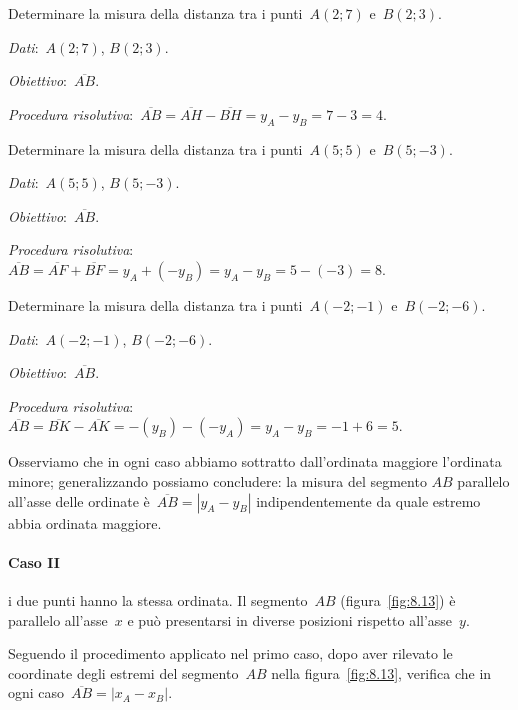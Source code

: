 \begin{exrig}
 \begin{esempio}
Determinare la misura della distanza tra i punti~$A(2;7)$ e~$B(2;3)$.

\emph{Dati}:~$A(2;7)$, $B(2;3)$.

\emph{Obiettivo}:~$\overline{AB}$.

\emph{Procedura risolutiva}:~$\overline{AB}=\overline{AH}-\overline{BH}=y_{A}-y_{B}=7-3=4$.

 \end{esempio}
 \begin{esempio}
 \label{ex:8.16}
Determinare la misura della distanza tra i punti~$A(5;5)$ e~$B(5;-3)$.

\emph{Dati}:~$A(5;5)$, $B(5;-3)$.

\emph{Obiettivo}:~$\overline{AB}$.

\emph{Procedura risolutiva}:~$\overline{AB}=\overline{AF}+\overline{BF}=y_{A}+(-y_{B})=y_{A}-y_{B}=5-(-3)=8$.

 \end{esempio}
 \begin{esempio}
Determinare la misura della distanza tra i punti~$A(-2;-1)$ e~$B(-2;-6)$.

\emph{Dati}:~$A(-2;-1)$, $B(-2;-6)$.

\emph{Obiettivo}:~$\overline{AB}$.

\emph{Procedura risolutiva}:~$\overline{AB}=\overline{BK}-\overline{AK}=-(y_{B})-(-y_{A})=y_{A}-y_{B}=-1+6=5$.

 \end{esempio}
\end{exrig}
Osserviamo che in ogni caso abbiamo sottratto dall'ordinata maggiore l'ordinata minore; generalizzando possiamo concludere:
la misura del segmento $AB$ parallelo all'asse delle ordinate è~$\overline{AB}=|y_{A}-y_{B}|$
indipendentemente da quale estremo abbia ordinata maggiore.

\paragraph{Caso II} i due punti hanno la stessa ordinata. Il segmento~$AB$ (figura~\ref{fig:8.13}) è parallelo all'asse~$x$ e
può presentarsi in diverse posizioni rispetto all'asse~$y$.

Seguendo il procedimento applicato nel primo caso, dopo aver rilevato le coordinate degli estremi del segmento~$AB$
nella figura~\ref{fig:8.13}, verifica che in ogni caso~$\overline{AB}=|x_{A}-x_{B}|$.

